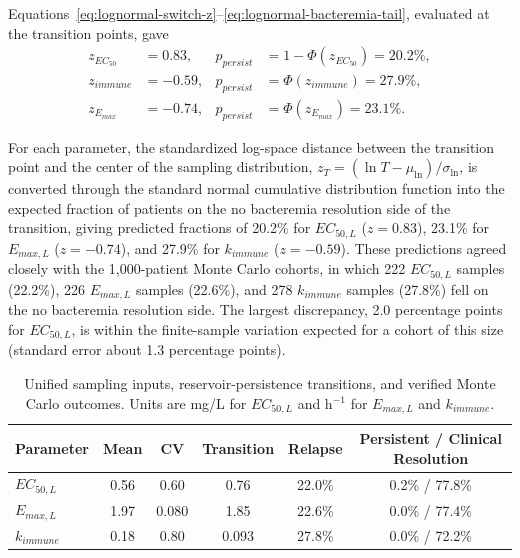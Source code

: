\documentclass[utf8]{FrontiersinHarvard} %
\begin{document}
Equations~\eqref{eq:lognormal-switch-z}--\eqref{eq:lognormal-bacteremia-tail}, evaluated at the
transition points, gave
\begin{equation}
\begin{aligned}
z_{EC_{50}} &= 0.83,  & p_{persist} &= 1-\Phi(z_{EC_{50}})=20.2\%,\\
z_{immune} &= -0.59, & p_{persist} &= \Phi(z_{immune})=27.9\%,\\
z_{E_{max}} &= -0.74, &
p_{persist} &= \Phi(z_{E_{max}})=23.1\%.
\end{aligned}
\label{eq:evaluated-persistence-tails}
\end{equation}

For each parameter, the standardized log-space distance between the transition point and the center of the sampling distribution, $z_T = (\ln T - \mu_{\ln})/\sigma_{\ln}$, is converted through the standard normal cumulative distribution function into the expected fraction of patients on the no bacteremia resolution side of the transition, giving predicted fractions of 20.2\% for $EC_{50,L}$ ($z = 0.83$), 23.1\% for $E_{max,L}$ ($z = -0.74$), and
27.9\% for $k_{immune}$ ($z = -0.59$). These predictions agreed closely with the 1,000-patient Monte Carlo cohorts, in which 222 $EC_{50,L}$ samples (22.2\%), 226 $E_{max,L}$ samples (22.6\%), and 278 $k_{immune}$ samples (27.8\%) fell on the no bacteremia resolution side. The largest discrepancy, 2.0 percentage points for $EC_{50,L}$, is within the finite-sample variation expected for a cohort of this size (standard error about 1.3 percentage points).

\begin{table}[H]
    \centering
    \small
    \begin{tabular}{@{}lccccc@{}}
        \toprule
        Parameter & Mean & CV & Transition & Relapse & Persistent / Clinical Resolution \\
        \midrule
        $EC_{50,L}$ & 0.56 & 0.60 & 0.76 & 22.0\% & 0.2\% / 77.8\% \\
        $E_{max,L}$ & 1.97 & 0.080 & 1.85 & 22.6\% & 0.0\% / 77.4\% \\
        $k_{immune}$ & 0.18 & 0.80 & 0.093 & 27.8\% & 0.0\% / 72.2\% \\
        \bottomrule
    \end{tabular}
    \caption{Unified sampling inputs, reservoir-persistence
    transitions, and verified Monte Carlo outcomes. Units are mg/L for
    $EC_{50,L}$ and h$^{-1}$ for $E_{max,L}$ and $k_{immune}$.}
    \label{tab:current_summary}
\end{table}
\end{document}
